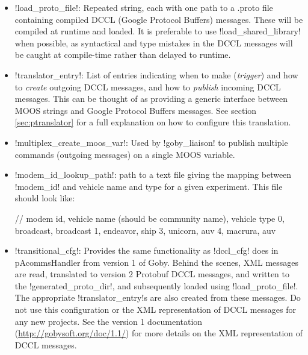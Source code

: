 \begin{itemize}
\item !load_proto_file!: Repeated string, each with one path to a .proto file containing compiled DCCL (Google Protocol Buffers) messages. These will be compiled at runtime and loaded. It is preferable to use !load_shared_library! when possible, as syntactical and type mistakes in the DCCL messages will be caught at compile-time rather than delayed to runtime.
\item !translator_entry!: List of entries indicating when to make (\textit{trigger}) and how to \textit{create} outgoing DCCL messages, and how to \textit{publish} incoming DCCL messages. This can be thought of as providing a generic interface between MOOS strings and Google Protocol Buffers messages. See section \ref{sec:ptranslator} for a full explanation on how to configure this translation.
\item !multiplex_create_moos_var!: Used by !goby_liaison! to publish multiple commands (outgoing messages) on a single MOOS variable.
\item !modem_id_lookup_path!: path to a text file giving the mapping between !modem_id! and vehicle name and type for a given experiment. This file should look like:
\begin{boxedverbatim}
// modem id, vehicle name (should be community name), vehicle type
0, broadcast, broadcast
1, endeavor, ship
3, unicorn, auv
4, macrura, auv
\end{boxedverbatim}
\resetbvlinenumber
\item !transitional_cfg!: Provides the same functionality as !dccl_cfg! does in pAcommsHandler from version 1 of Goby. Behind the scenes, XML messages are read, translated to version 2 Protobuf DCCL messages, and written to the !generated_proto_dir!, and subsequently loaded using !load_proto_file!. The appropriate !translator_entry!s are also created from these messages. Do not use this configuration or the XML representation of DCCL messages for any new projects. See the version 1 documentation (\url{http://gobysoft.org/doc/1.1/}) for more details on the XML representation of DCCL messages.
\end{itemize}

